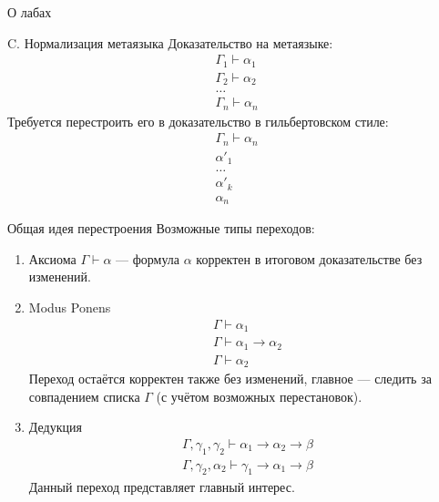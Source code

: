 \documentclass[aspectratio=169]{beamer}
\begin{document}
\newcommand\doubleplus{+\kern-1.3ex+\kern0.8ex}
\newcommand\mdoubleplus{\ensuremath{\mathbin{+\mkern-10mu+}}}

\begin{frame}{}
\begin{center}\Large О лабах\end{center}
\end{frame}

\begin{frame}{C. Нормализация метаязыка}
Доказательство на метаязыке:
$$\begin{array}{l}\Gamma_1 \vdash \alpha_1\\\Gamma_2 \vdash \alpha_2\\\dots\\\Gamma_n \vdash \alpha_n\end{array}$$
Требуется перестроить его в доказательство в гильбертовском стиле:
$$\begin{array}{l}\Gamma_n\vdash\alpha_n\\\alpha'_1\\\dots\\\alpha'_k\\\alpha_n\end{array}$$
\end{frame}

\begin{frame}{Общая идея перестроения}
Возможные типы переходов:
\begin{enumerate}
\item Аксиома $\Gamma \vdash \alpha$ --- формула $\alpha$ корректен в итоговом доказательстве без изменений.
\item Modus Ponens $$\begin{array}{l}\Gamma \vdash \alpha_1\\\Gamma\vdash\alpha_1\rightarrow\alpha_2\\\Gamma\vdash\alpha_2\end{array}$$
Переход остаётся корректен также без изменений, главное --- следить за совпадением списка $\Gamma$ (с учётом возможных перестановок).
\item Дедукция $$\begin{array}{l}
    \Gamma,\gamma_1,\gamma_2\vdash\alpha_1\rightarrow\alpha_2\rightarrow\beta\\
    \Gamma,\gamma_2,\alpha_2\vdash\gamma_1\rightarrow\alpha_1\rightarrow\beta
\end{array}$$
Данный переход представляет главный интерес.
\end{enumerate}
\end{frame}
\end{document}
